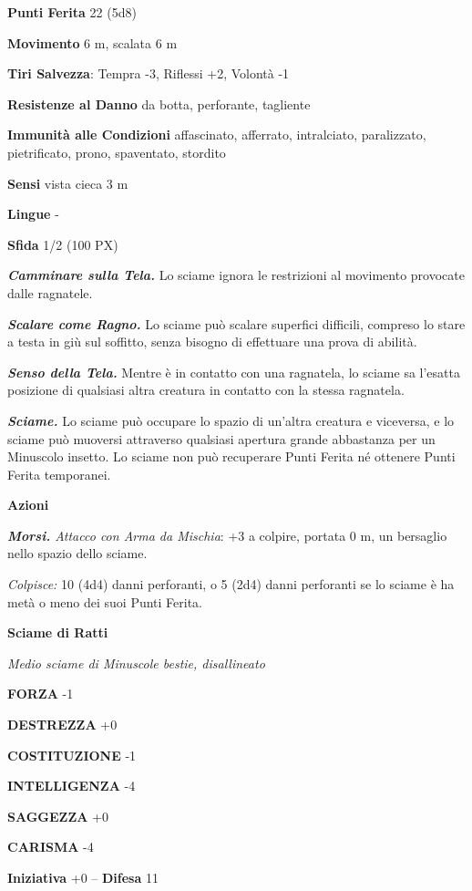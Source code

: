 \begin{multicols}{2}
\textbf{Punti Ferita} 22 (5d8)

\textbf{Movimento} 6 m, scalata 6 m

\textbf{Tiri Salvezza}: Tempra -3, Riflessi +2, Volontà -1

\textbf{Resistenze al Danno} da botta, perforante, tagliente

\textbf{Immunità alle Condizioni} affascinato, afferrato, intralciato, paralizzato, pietrificato, prono, spaventato, stordito

\textbf{Sensi} vista cieca 3 m

\textbf{Lingue} -

\textbf{Sfida} 1/2 (100 PX)

\textit{\textbf{Camminare sulla Tela.}} Lo sciame ignora le restrizioni al movimento provocate dalle ragnatele.

\textit{\textbf{Scalare come Ragno.}} Lo sciame può scalare superfici difficili, compreso lo stare a testa in giù sul soffitto, senza bisogno di effettuare una prova di abilità.

\textit{\textbf{Senso della Tela.}} Mentre è in contatto con una ragnatela, lo sciame sa l'esatta posizione di qualsiasi altra creatura in contatto con la stessa ragnatela.

\textit{\textbf{Sciame.}} Lo sciame può occupare lo spazio di un'altra creatura e viceversa, e lo sciame può muoversi attraverso qualsiasi apertura grande abbastanza per un Minuscolo insetto. Lo sciame non può recuperare Punti Ferita né ottenere Punti Ferita temporanei.

\textbf{Azioni}

\textit{\textbf{Morsi.} Attacco con Arma da Mischia}: +3 a colpire, portata 0 m, un bersaglio nello spazio dello sciame.

\textit{Colpisce:} 10 (4d4) danni perforanti, o 5 (2d4) danni perforanti se lo sciame è ha metà o meno dei suoi Punti Ferita.

\medskip\textbf{Sciame di Ratti}

\textit{Medio sciame di Minuscole bestie, disallineato}

\textbf{FORZA} -1

\textbf{DESTREZZA} +0

\textbf{COSTITUZIONE} -1

\textbf{INTELLIGENZA} -4

\textbf{SAGGEZZA} +0

\textbf{CARISMA} -4

\textbf{Iniziativa} +0 -- \textbf{Difesa} 11


\end{multicols}
